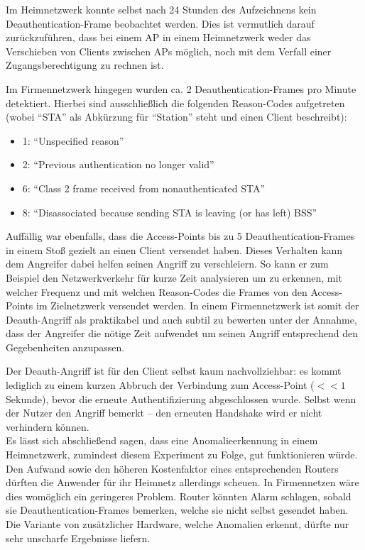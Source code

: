 Im Heimnetzwerk konnte selbst nach 24 Stunden des Aufzeichnens kein Deauthentication-Frame beobachtet werden. Dies ist vermutlich darauf zurückzuführen, dass bei einem AP in einem Heimnetzwerk weder das Verschieben von Clients zwischen APs möglich, noch mit dem Verfall einer Zugangsberechtigung zu rechnen ist.

Im Firmennetzwerk hingegen wurden ca. 2 Deauthentication-Frames pro Minute detektiert.
Hierbei sind ausschließlich die folgenden Reason-Codes aufgetreten (wobei \enquote{STA} als Abkürzung für \enquote{Station} steht und einen Client beschreibt):
\begin{itemize}
	\item 1: \enquote{Unspecified reason}
	\item 2: \enquote{Previous authentication no longer valid}
	\item 6: \enquote{Class 2 frame received from nonauthenticated STA}
	\item 8: \enquote{Disassociated because sending STA is leaving (or has left) BSS}
\end{itemize}
Auffällig war ebenfalls, dass die Access-Points bis zu 5 Deauthentication-Frames in einem Stoß gezielt an einen Client versendet haben.
Dieses Verhalten kann dem Angreifer dabei helfen seinen Angriff zu verschleiern.
So kann er zum Beispiel den Netzwerkverkehr für kurze Zeit analysieren um zu erkennen, mit welcher Frequenz und mit welchen Reason-Codes die Frames von den Access-Points im Zielnetzwerk versendet werden.
In einem Firmennetzwerk ist somit der Deauth-Angriff als praktikabel und auch subtil zu bewerten unter der Annahme, dass der Angreifer die nötige Zeit aufwendet um seinen Angriff entsprechend den Gegebenheiten anzupassen.

Der Deauth-Angriff ist für den Client selbst kaum nachvollziehbar: es kommt lediglich zu einem kurzen Abbruch der Verbindung zum Access-Point ($<< 1$ Sekunde), bevor die erneute Authentifizierung abgeschlossen wurde. Selbst wenn der Nutzer den Angriff bemerkt -- den erneuten Handshake wird er nicht verhindern können.\\

Es lässt sich abschließend sagen, dass eine Anomalieerkennung in einem Heimnetzwerk, zumindest diesem Experiment zu Folge, gut funktionieren würde. Den Aufwand sowie den höheren Kostenfaktor eines entsprechenden Routers dürften die Anwender für ihr Heimnetz allerdings scheuen. In Firmennetzen wäre dies womöglich ein geringeres Problem. Router könnten Alarm schlagen, sobald sie Deauthentication-Frames bemerken, welche sie nicht selbst gesendet haben. Die Variante von zusätzlicher Hardware, welche Anomalien erkennt, dürfte nur sehr unscharfe Ergebnisse liefern.\\


